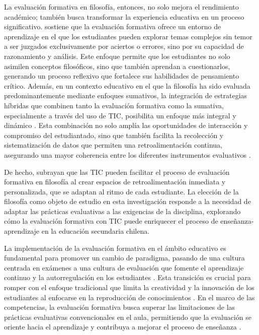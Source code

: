 \documentclass[spanish]{textolivre}
\begin{document}
La evaluación formativa en filosofía, entonces, no solo mejora el rendimiento académico; también busca transformar la experiencia educativa en un proceso significativo. \textcite{lopez-pastor2011} sostiene que la evaluación formativa ofrece un entorno de aprendizaje en el que los estudiantes pueden explorar temas complejos sin temor a ser juzgados exclusivamente por aciertos o errores, sino por su capacidad de razonamiento y análisis. Este enfoque permite que los estudiantes no solo asimilen conceptos filosóficos, sino que también aprendan a cuestionarlos, generando un proceso reflexivo que fortalece sus habilidades de pensamiento crítico. Además, en un contexto educativo en el que la filosofía ha sido evaluada predominantemente mediante enfoques sumativos, la integración de estrategias híbridas que combinen tanto la evaluación formativa como la sumativa, especialmente a través del uso de TIC, posibilita un enfoque más integral y dinámico \cite{black2009, nicol2006}. Esta combinación no solo amplía las oportunidades de interacción y compromiso del estudiantado, sino que también facilita la recolección y sistematización de datos que permiten una retroalimentación continua, asegurando una mayor coherencia entre los diferentes instrumentos evaluativos \cite{sadler1989}.

De hecho, \textcite{gallardo-fuentes2017} subrayan que las TIC pueden facilitar el proceso de evaluación formativa en filosofía al crear espacios de retroalimentación inmediata y personalizada, que se adaptan al ritmo de cada estudiante. La elección de la filosofía como objeto de estudio en esta investigación responde a la necesidad de adaptar las prácticas evaluativas a las exigencias de la disciplina, explorando cómo la evaluación formativa con TIC puede enriquecer el proceso de enseñanza-aprendizaje en la educación secundaria chilena.

La implementación de la evaluación formativa en el ámbito educativo es fundamental para promover un cambio de paradigma, pasando de una cultura centrada en exámenes a una cultura de evaluación que fomente el aprendizaje continuo y la autorregulación en los estudiantes \cite{bizarro2019}. Esta transición es crucial para romper con el enfoque tradicional que limita la creatividad y la innovación de los estudiantes al enfocarse en la reproducción de conocimientos \cite{mendoza2020}. En el marco de las competencias, la evaluación formativa busca superar las limitaciones de las prácticas evaluativas convencionales en el aula, permitiendo que la evaluación se oriente hacia el aprendizaje y contribuya a mejorar el proceso de enseñanza \cite{galarza-salazar2021}.
\end{document}
